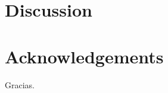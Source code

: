 \documentclass{emulateapj}
\begin{document}

\section{Discussion} 
\section{Acknowledgements}
Gracias.


\end{document}
